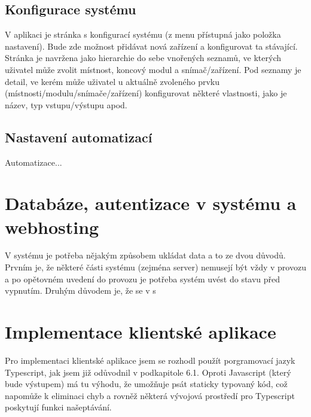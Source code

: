 \subsection*{Konfigurace systému}
V aplikaci je stránka s konfigurací systému (z menu přístupná jako položka nastavení). Bude zde možnost přidávat nová zařízení a konfigurovat ta stávající. Stránka je navržena jako hierarchie do sebe vnořených seznamů, ve kterých uživatel může zvolit místnost, koncový modul a snímač/zařízení. Pod seznamy je detail, ve kerém může uživatel u aktuálně zvoleného prvku (místnosti/modulu/snímače/zařízení) konfigurovat některé vlastnosti, jako je název, typ vstupu/výstupu apod. 

\subsection*{Nastavení automatizací}
Automatizace...
\section{Databáze, autentizace v systému a webhosting}
\label{subsec:firebase}
V systému je potřeba nějakým způsobem ukládat data a to ze dvou důvodů. Prvním je, že některé části systému (zejména server) nemusejí být vždy v provozu a po opětovném uvedení do provozu je potřeba systém uvést do stavu před vypnutím. Druhým důvodem je, že se v s

\section{Implementace klientské aplikace}



Pro implementaci klientské aplikace jsem se rozhodl použít porgramovací jazyk Typescript, jak jsem již odůvodnil v podkapitole 6.1. Oproti Javascript (který bude výstupem) má tu výhodu, že umožňuje psát staticky typovaný kód, což napomůže k eliminaci chyb a rovněž některá vývojová prostředí pro Typescript poskytují funkci našeptávání. 

